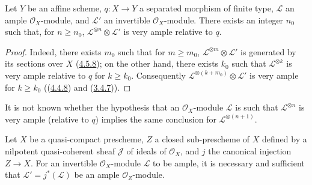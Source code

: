 \begin{corollary}[4.5.11]
\label{II.4.5.11}
Let $Y$ be an affine scheme, $q:X\to Y$ a separated morphism of finite type,
$\mathcal{L}$ an ample $\mathcal{O}_X$-module, and $\mathcal{L}'$ an
invertible $\mathcal{O}_X$-module. There exists an integer $n_0$ such that, for
$n\geq n_0$, $\mathcal{L}^{\otimes n}\otimes\mathcal{L}'$ is very ample
relative to $q$.
\end{corollary}

\begin{proof}
Indeed, there exists $m_0$ such that for $m\geq m_0$,
$\mathcal{L}^{\otimes m}\otimes\mathcal{L}'$ is generated by its sections
over $X$ (\hyperref[II.4.5.8]{4.5.8}); on the other hand, there exists
$k_0$ such that $\mathcal{L}^{\otimes k}$ is very ample relative to $q$
for $k\geq k_0$. Consequently
$\mathcal{L}^{\otimes(k+m_0)}\otimes\mathcal{L}'$ is very ample for
$k\geq k_0$ ((\hyperref[II.4.4.8]{4.4.8}) and
(\hyperref[II.3.4.7]{3.4.7})).
\end{proof}

\begin{remark}[4.5.12]
\label{II.4.5.12}
It is not known whether the hypothesis that an $\mathcal{O}_X$-module $\mathcal{L}$ is such
that $\mathcal{L}^{\otimes n}$ is very ample (relative to $q$) implies
the same conclusion for $\mathcal{L}^{\otimes(n+1)}$.
\end{remark}

\begin{proposition}[4.5.13]
\label{II.4.5.13}
Let $X$ be a quasi-compact prescheme, $Z$ a closed sub-prescheme of $X$
defined by a \textup{nilpotent} quasi-coherent sheaf $\mathcal{J}$ of ideals of
$\mathcal{O}_X$, and $j$ the canonical injection $Z\to X$. For an
invertible $\mathcal{O}_X$-module $\mathcal{L}$ to be ample, it is necessary and
sufficient that $\mathcal{L}'=j^*(\mathcal{L})$ be an ample
$\mathcal{O}_Z$-module.
\end{proposition}


